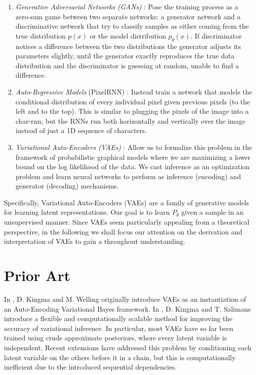 \documentclass[11pt]{article}
\theoremstyle{plain}
\theoremstyle{definition}
\theoremstyle{plain}
\begin{document}
\begin{enumerate}
\item \textit{Generative Adversarial Networks (GANs)} \cite{NIPS2014_5423}:
Pose the training process as a zero-sum game between two separate
networks: a generator network and a discriminative network that try
to classify samples as either coming from the true distribution $p(x)$
or the model distribution $p_{\theta}(x)$. If discriminator notices
a difference between the two distributions the generator adjusts its
parameters slightly, until the generator exactly reproduces the true
data distribution and the discriminator is guessing at random, unable
to find a difference.
\item \textit{Auto-Regressive Models} (PixelRNN) \cite{DBLP:journals/corr/OordKK16}:
Instead train a network that models the conditional distribution of
every individual pixel given previous pixels (to the left and to the
top). This is similar to plugging the pixels of the image into a char-rnn,
but the RNNs run both horizontally and vertically over the image instead
of just a 1D sequence of characters.
\item \textit{Variational Auto-Encoders (VAEs)} \cite{journals/corr/KingmaW13}:
Allow us to formalize this problem in the framework of probabilistic
graphical models where we are maximizing a lower bound on the log
likelihood of the data. We cast inference as an optimization problem
and learn neural networks to perform as inference (encoding) and generator
(decoding) mechanisms.
\end{enumerate}
Specifically, Variational Auto-Encoders (VAEs) are a family of generative
models for learning latent representations. Our goal is to learn $P_{\theta}$
given a sample in an unsupervised manner. Since VAEs seem particularly
appealing from a theoretical perspective, in the following we shall
focus our attention on the derivation and interpretation of VAEs to
gain a throughout understanding.

\section{Prior Art}

In \cite{journals/corr/KingmaW13}, D. Kingma and M. Welling originally
introduce VAEs as an instantiation of an Auto-Encoding Variational
Bayes framework. In \cite{DBLP:journals/corr/KingmaSW16}, D. Kingma
and T. Salimans introduce a flexible and computationally scalable
method for improving the accuracy of variational inference. In particular,
most VAEs have so far been trained using crude approximate posteriors,
where every latent variable is independent. Recent extensions \cite{icml2015_rezende15}
have addressed this problem by conditioning each latent variable on
the others before it in a chain, but this is computationally inefficient
due to the introduced sequential dependencies.
\end{document}
